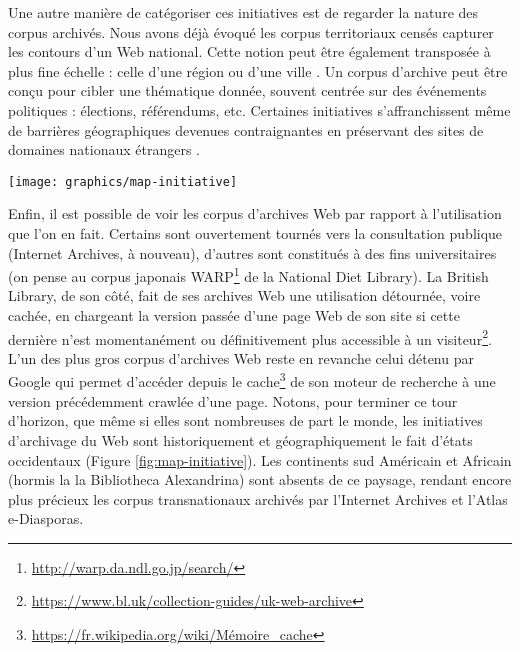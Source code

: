 \documentclass[symmetric,justified,marginals=raggedouter]{tufte-book}
\begin{document}
Une autre manière de catégoriser ces initiatives est de regarder la nature des corpus archivés. Nous avons déjà évoqué les corpus territoriaux censés capturer les contours d'un Web national. Cette notion peut être également transposée à plus fine échelle : celle d'une région ou d'une ville \citep{boudrez_archiving_2002}. Un corpus d'archive peut être conçu pour cibler une thématique donnée, souvent  centrée sur des événements politiques \citep{voerman_archiving_2002,schneider_building_2003} : élections, référendums, etc. Certaines initiatives s'affranchissent même de barrières géographiques devenues contraignantes en préservant des sites de domaines nationaux étrangers \citep{gomes_introducing_2009}.

\begin{figure*}%
  \texttt{[image: graphics/map-initiative]}
  \caption{Carte des initiatives d'archivage du Web par pays et années de création (source de données \citep{gomes_survey_2011} et Wikipédia \url{https://en.wikipedia.org/wiki/List_of_Web_archiving_initiatives})}
  \label{fig:map-initiative}
\end{figure*} 

\noindent Enfin, il est possible de voir les corpus d'archives Web par rapport à l'utilisation que l'on en fait. Certains sont ouvertement tournés vers la consultation publique (Internet Archives, à nouveau), d'autres sont constitués à des fins universitaires (on pense au corpus japonais WARP\footnote{\url{http://warp.da.ndl.go.jp/search/}} de la National Diet Library). La British Library, de son côté, fait de ses archives Web une utilisation détournée, voire cachée, en chargeant la version passée d'une page Web de son site si cette dernière n'est momentanément ou définitivement plus accessible à un visiteur\footnote{\url{https://www.bl.uk/collection-guides/uk-web-archive}}. L'un des plus gros corpus d'archives Web reste en revanche celui détenu par Google qui permet d'accéder depuis le cache\footnote{\url{https://fr.wikipedia.org/wiki/Mémoire_cache}} de son moteur de recherche à une version précédemment crawlée d'une page. Notons, pour terminer ce tour d'horizon, que même si elles sont nombreuses de part le monde, les initiatives d'archivage du Web sont historiquement et géographiquement le fait d'états occidentaux (Figure \ref{fig:map-initiative}). Les continents sud Américain et Africain (hormis la la Bibliotheca Alexandrina) sont absents de ce paysage, rendant encore plus précieux les corpus transnationaux archivés par l'Internet Archives et l'Atlas e-Diasporas.  
\end{document}
